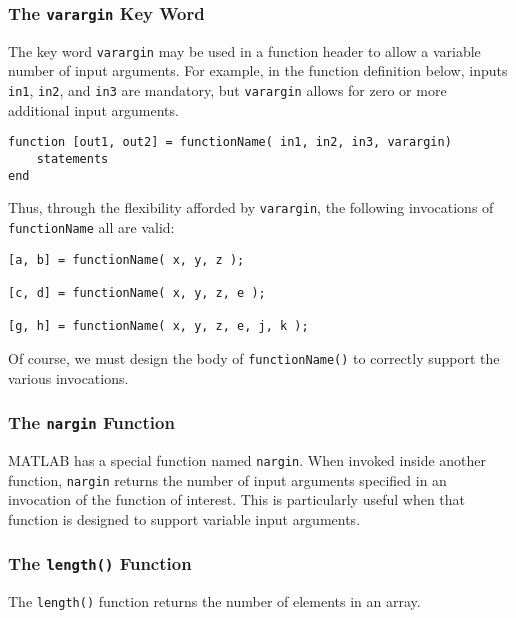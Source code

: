 \subsubsection{The \texttt{varargin} Key Word}
The key word \texttt{varargin} may be used in a function header to allow a variable number of input arguments. For example, in the function definition below, inputs \texttt{in1}, \texttt{in2}, and \texttt{in3} are mandatory, but \texttt{varargin} allows for zero or more additional input arguments.
\begin{lstlisting}[style=Matlab-editor]
function [out1, out2] = functionName( in1, in2, in3, varargin)
	statements
end
\end{lstlisting}
Thus, through the flexibility afforded by \texttt{varargin}, the following invocations of \texttt{functionName} all are valid:
\begin{lstlisting}[style=Matlab-editor]
[a, b] = functionName( x, y, z );

[c, d] = functionName( x, y, z, e );

[g, h] = functionName( x, y, z, e, j, k );
\end{lstlisting}
Of course, we must design the body of \texttt{functionName()} to correctly support the various invocations.

\subsubsection{The \texttt{nargin} Function}
MATLAB has a special function named \texttt{nargin}. When invoked inside another function, \texttt{nargin} returns the number of input arguments specified in an invocation of the function of interest. This is particularly useful when that function is designed to support variable input arguments.

\subsubsection{The \texttt{length()} Function}
The \texttt{length()} function returns the number of elements in an array.


